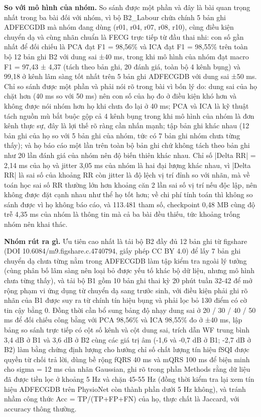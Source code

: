 \documentclass[12pt,a4paper]{article}
\begin{document}
\noindent \textbf{\color{tdtblue}So với mô hình của nhóm.} So sánh được một phần và đây là bài quan trọng nhất trong ba bài đối với nhóm, vì bộ B2\_Labour chứa chính 5 bản ghi ADFECGDB mà nhóm đang dùng (r01, r04, r07, r08, r10), cùng điều kiện chuyển dạ và cùng nhãn chuẩn là FECG trực tiếp từ đầu thai nhi: con số gần nhất để đối chiếu là PCA đạt F1 = 98,56\% và ICA đạt F1 = 98,55\% trên toàn bộ 12 bản ghi B2 với dung sai ±40 ms, trong khi mô hình của nhóm đạt macro F1 = 97,43 ± 4,37 (tách theo bản ghi, 20 đánh giá, toàn bộ 4 kênh bụng) và 99,18 ở kênh lâm sàng tốt nhất trên 5 bản ghi ADFECGDB với dung sai ±50 ms. Chỉ so sánh được một phần và phải nói rõ trong bài vì bốn lý do: dung sai của họ chặt hơn (40 ms so với 50 ms) nên con số của họ đo ở điều kiện khó hơn và không được nói nhóm hơn họ khi chưa đo lại ở 40 ms; PCA và ICA là kỹ thuật tách nguồn mù bắt buộc gộp cả 4 kênh bụng trong khi mô hình của nhóm là đơn kênh thực sự, đây là lợi thế rõ ràng cần nhấn mạnh; tập bản ghi khác nhau (12 bản ghi của họ so với 5 bản ghi của nhóm, tức có 7 bản ghi nhóm chưa từng thấy); và họ báo cáo một lần trên toàn bộ bản ghi chứ không tách theo bản ghi như 20 lần đánh giá của nhóm nên độ biến thiên khác nhau. Chỉ số |Delta RR| = 2,14 ms của họ và jitter 3,05 ms của nhóm là hai đại lượng khác nhau, vì |Delta RR| là sai số của khoảng RR còn jitter là độ lệch vị trí đỉnh so với nhãn, mà về toán học sai số RR thường lớn hơn khoảng căn 2 lần sai số vị trí nếu độc lập, nên không được đặt cạnh nhau như thể họ tốt hơn; về chi phí tính toán thì không so sánh được vì họ không báo cáo, và 113.481 tham số, checkpoint 0,48 MB cùng độ trễ 4,35 ms của nhóm là thông tin mà cả ba bài đều thiếu, tức khoảng trống nhóm nên khai thác.\par\vspace{3pt}
\noindent \textbf{\color{tdtblue}Nhóm rút ra gì.} Ưu tiên cao nhất là tải bộ B2 đầy đủ 12 bản ghi từ figshare (DOI 10.6084/m9.figshare.c.4740794, giấy phép CC BY 4.0) để lấy 7 bản ghi chuyển dạ chưa từng nằm trong ADFECGDB làm tập kiểm tra ngoài lý tưởng (cùng phân bố lâm sàng nên loại bỏ được yếu tố khác bộ dữ liệu, nhưng mô hình chưa từng thấy), và tải bộ B1 gồm 10 bản ghi thai kỳ 20 phút tuần 32-42 để mở rộng phạm vi ứng dụng từ chuyển dạ sang trước sinh, với điều kiện phải ghi rõ nhãn của B1 được suy ra từ chính tín hiệu bụng và phải lọc bỏ 130 điểm có cờ tin cậy bằng 0. Đồng thời cần bổ sung bảng độ nhạy dung sai ở 20 / 30 / 40 / 50 ms để đối chiếu công bằng với PCA 98,56\% và ICA 98,55\% đo ở ±40 ms, lập bảng so sánh trực tiếp có cột số kênh và cột dung sai, trích dẫn WF trung bình 3,4 dB ở B1 và 3,6 dB ở B2 cùng các giá trị âm (-1,6 và -0,7 dB ở B1; -2,7 dB ở B2) làm bằng chứng định lượng cho hướng chỉ số chất lượng tín hiệu fSQI được quyền từ chối trả lời, dùng bề rộng fQRS 40 ms và mQRS 100 ms để biện minh cho sigma = 12 ms của nhãn Gaussian, ghi rõ trong phần Methods rằng dữ liệu đã được tiền lọc ở khoảng 5 Hz và chặn 45-55 Hz (đồng thời kiểm tra lại xem tín hiệu ADFECGDB trên PhysioNet còn thành phần dưới 5 Hz không), và tránh nhầm công thức Acc = TP/(TP+FP+FN) của họ, thực chất là Jaccard, với accuracy thông thường.\par\vspace{3pt}
\vspace{6pt}
\clearpage
\end{document}
